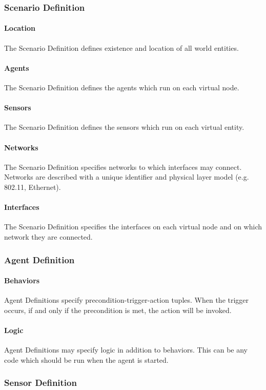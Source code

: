 \documentclass[titlepage]{article}
\newcommand{\cbox}[0]{
    \CheckBox[height=5pt,width=5pt]{}
}
\begin{document}
\begin{Form}
\subsubsection{Scenario Definition}
	\paragraph{Location} The Scenario Definition defines existence and location of all world entities.\cbox
    \paragraph{Agents} The Scenario Definition defines the agents which run on each virtual node.\cbox
    \paragraph{Sensors} The Scenario Definition defines the sensors which run on each virtual entity.\cbox
	\paragraph{Networks} The Scenario Definition specifies networks to which interfaces may connect.  Networks are described with a unique identifier and physical layer model (e.g. 802.11, Ethernet).\cbox
	\paragraph{Interfaces} The Scenario Definition specifies the interfaces on each virtual node and on which network they are connected.\cbox

\subsubsection{Agent Definition}
    \paragraph{Behaviors} Agent Definitions specify precondition-trigger-action tuples.  When the trigger occurs, if and only if the precondition is met, the action will be invoked.\cbox
    \paragraph{Logic} Agent Definitions may specify logic in addition to behaviors.  This can be any code which should be run when the agent is started.\cbox

\subsubsection{Sensor Definition}

\end{Form}
\end{document}
